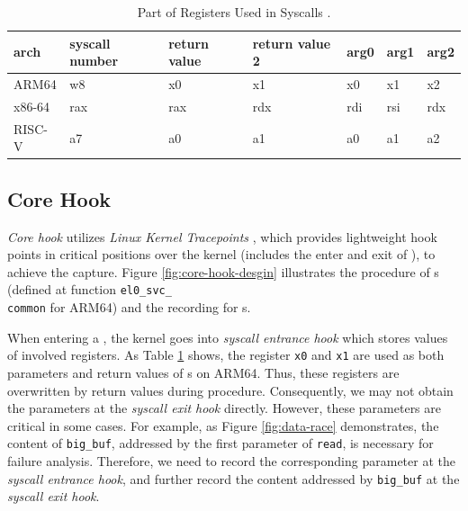 \begin{table}
    \caption{
        Part of Registers Used in Syscalls \cite{syscall}.}
    \centering
    \begin{tabular}{lllllll}
        \toprule
        arch                      &  syscall number &
        return value &
        return value 2 & arg0                      & arg1 &
        arg2                                                               \\
        \midrule
        ARM64                     & w8                        & x0   & x1
                                  & x0                        & x1   & x2  \\
        x86-64                    & rax                       & rax  &
        rdx                       & rdi                       & rsi  & rdx
        \\
        RISC-V                     & a7                        & a0   & a1
                                  & a0                        & a1   & a2  \\
        \bottomrule
    \end{tabular}
    \label{table:arch_registers}
\end{table}


\subsection{Core Hook}

\textit{Core hook} utilizes \textit{Linux Kernel Tracepoints} \cite{mathieu2021using}, which
provides lightweight hook points in critical positions over the kernel
(includes the enter and exit of \syscall{}), to achieve the capture.  Figure \ref{fig:core-hook-desgin} illustrates the procedure of \syscall{}s
(defined at function \texttt{el0\_svc\_\\common} for ARM64) and the recording for \syscall{}s. 


When entering a \syscall{}, the kernel goes into \textit{syscall entrance
hook} which stores values of involved registers. As Table
\ref{table:arch_registers} shows, the register \texttt{x0} and \texttt{x1} are used as both
parameters and return values of \syscall{}s on ARM64. Thus, these registers are
overwritten by return values during \syscall{} procedure. Consequently, we may not
obtain the \syscall{} parameters at the \textit{syscall exit hook} directly.
However, these parameters are critical in some cases. For example, as Figure
\ref{fig:data-race} demonstrates, the content of \texttt{big\_buf}, addressed by
the first parameter of \texttt{read}, is necessary for failure analysis.
Therefore, we need to record the corresponding parameter at the \textit{syscall
entrance hook}, and further record the content addressed by \texttt{big\_buf} at 
the \textit{syscall exit hook}.

